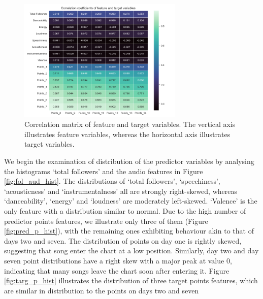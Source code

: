 \documentclass{article}
\begin{document}
\begin{figure}
    \centering
    \includegraphics[width=0.7\textwidth]{figures/correlation_matrix.png}
    \caption{Correlation matrix of feature and target variables. The vertical axis illustrates feature variables, whereas the horizontal axis illustrates target variables.}
    \label{fig:corr_matrix}
    
\end{figure}

We begin the examination of distribution of the predictor variables by analysing the histograms ‘total followers’ and the audio features in Figure \ref{fig:fol_aud_hist}.  The distributions of ‘total followers’, ‘speechiness’, ‘acousticness’ and ‘instrumentalness’ all are strongly right-skewed, whereas ‘danceability’, ‘energy’ and ‘loudness’ are moderately left-skewed. ‘Valence’ is the only feature with a distribution similar to normal.  Due to the high number of predictor points features, we illustrate only three of them (Figure \ref{fig:pred_p_hist}), with the remaining ones exhibiting behaviour akin to that of days two and seven. The distribution of points on day one is rightly skewed, suggesting that song enter the chart at a low position. Similarly, day two and day seven point distributions have a right skew with a major peak at value 0, indicating that many songs leave the chart soon after entering it.
Figure \ref{fig:targ_p_hist} illustrates the distribution of three target points features, which are similar in distribution to the points on days two and seven
\end{document}
